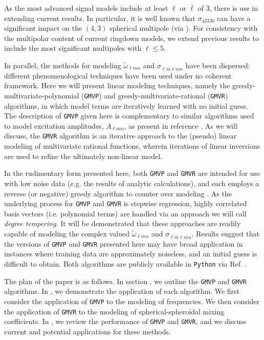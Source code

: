 \documentclass[twocolumn,aps,prd,floatfix,preprintnumbers,a4paper,nofootinbib,
superscriptaddress,10pt]{revtex4-1}
\newcommand{\cw}{\tilde{\omega}}
\def\lmn{_{\ell m n}}
\def\LMlmn{_{\bar{\ell} \bar{m} \ell m n}}
\def\gmvp#1{greedy-multivariate-polynomial#1
  (\texttt{GMVP}#1)\gdef\gmvp{\texttt{GMVP}}}
\def\gmvr#1{greedy-multivariate-rational#1
  (\texttt{GMVR}#1)\gdef\gmvr{\texttt{GMVR}}}
\begin{document}
%
As the most advanced signal models include at least $\ell$ or $\bar{\ell}$ of 3, there is use in extending current results.
%
In particular, it is well known that $\sigma_{43330}$ can have a significant impact on the $(4,3)$ spherical multipole (via ).
%
For consistency with the multipolar content of current ringdown models, we extend previous results to include the most significant multipoles with $\ell \leq 5$.
%
%
\par In parallel, the methods for modeling $\cw\lmn$ and $\sigma\LMlmn$ have been dispersed: different phenomenological techniques have been used under no coherent framework.
%
Here we will present linear modeling techniques, namely the \gmvp{} and \gmvr{} algorithms, in which model terms are iteratively learned with no initial guess.
%
The description of \gmvp{} given here is complementary to similar algorithms used to model \qnm{} excitation amplitudes, $A\lmn$, as present in reference \cite{London:2018gaq,London:2014cma}.
%
As we will discuss, the \gmvr{} algorithm is an iterative approach to the (pseudo) linear modeling of multivariate rational functions, wherein iterations of linear inversions are used to refine the ultimately non-linear model.
%
\par In the rudimentary form presented here, both \gmvp{} and \gmvr{} are intended for use with low noise data (e.g. the results of analytic calculations), and each employs a reverse (or negative) greedy algorithm to counter over modeling \cite{Field:2011mf,Caudill:2011kv}.
%
As the underlying process for \gmvp{} and \gmvr{} is stepwise regression, highly correlated basis vectors (i.e. polynomial terms) are handled via an approach we will call \textit{degree tempering}.
%
It will be demonstrated that these approaches are readily capable of modeling the complex valued $\cw\lmn$ and $\sigma\LMlmn$.
%
Results suggest that the versions of \gmvp{} and \gmvr{} presented here may have broad application in instances where training data are approximately noiseless, and an initial guess is difficult to obtain.
%
Both algorithms are publicly available in \texttt{Python} via Ref. \cite{lionel_london_2018_1402516}.
%
%
\par The plan of the paper is as follows.
%
In section , we outline the \gmvp{} and \gmvr{} algorithms.
%
In , we demonstrate the application of each algorithm.
%
We first consider the application of \gmvp{} to the modeling of \qnm{} frequencies.
%
We then consider the application of \gmvr{} to the modeling of spherical-spheroidal mixing coefficients.
%
In , we review the performance of \gmvp{} and \gmvr{}, and we discuss current and potential applications for these methods.
%
%
\end{document}
